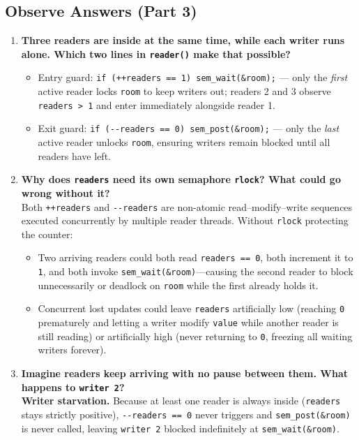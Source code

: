 \documentclass[12pt,a4paper]{article}
\begin{document}
\subsection{Observe Answers (Part 3)}
\begin{enumerate}
    \item \textbf{Three readers are inside at the same time, while each writer runs alone. Which two lines in \texttt{reader()} make that possible?}
    \begin{itemize}
        \item Entry guard: \texttt{if (++readers == 1) sem\_\allowbreak wait(\&room);} --- only the \emph{first} active reader locks \texttt{room} to keep writers out; readers 2 and 3 observe \texttt{readers > 1} and enter immediately alongside reader 1.
        \item Exit guard: \texttt{if (-{}-readers == 0) sem\_\allowbreak post(\&room);} --- only the \emph{last} active reader unlocks \texttt{room}, ensuring writers remain blocked until all readers have left.
    \end{itemize}

    \item \textbf{Why does \texttt{readers} need its own semaphore \texttt{rlock}? What could go wrong without it?} \\
    Both \texttt{++readers} and \texttt{-{}-readers} are non-atomic read--modify--write sequences executed concurrently by multiple reader threads. Without \texttt{rlock} protecting the counter:
    \begin{itemize}
        \item Two arriving readers could both read \texttt{readers == 0}, both increment it to \texttt{1}, and both invoke \texttt{sem\_\allowbreak wait(\&room)}---causing the second reader to block unnecessarily or deadlock on \texttt{room} while the first already holds it.
        \item Concurrent lost updates could leave \texttt{readers} artificially low (reaching \texttt{0} prematurely and letting a writer modify \texttt{value} while another reader is still reading) or artificially high (never returning to \texttt{0}, freezing all waiting writers forever).
    \end{itemize}

    \item \textbf{Imagine readers keep arriving with no pause between them. What happens to \texttt{writer 2}?} \\
    \textbf{Writer starvation.} Because at least one reader is always inside (\texttt{readers} stays strictly positive), \texttt{-{}-readers == 0} never triggers and \texttt{sem\_\allowbreak post(\allowbreak\&room)} is never called, leaving \texttt{writer 2} blocked indefinitely at \texttt{sem\_\allowbreak wait(\allowbreak\&room)}.
\end{enumerate}
\end{document}
